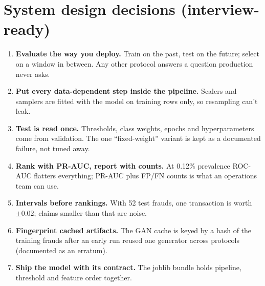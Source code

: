 \documentclass[11pt,a4paper]{article}
\begin{document}
\section{System design decisions (interview-ready)}
\begin{enumerate}[leftmargin=1.2cm]
\item \textbf{Evaluate the way you deploy.} Train on the past, test on the future; select on a window in
between. Any other protocol answers a question production never asks.
\item \textbf{Put every data-dependent step inside the pipeline.} Scalers and samplers are fitted with the
model on training rows only, so resampling can't leak.
\item \textbf{Test is read once.} Thresholds, class weights, epochs and hyperparameters come from
validation. The one ``fixed-weight'' variant is kept as a documented failure, not tuned away.
\item \textbf{Rank with PR-AUC, report with counts.} At 0.12\% prevalence ROC-AUC flatters everything;
PR-AUC plus FP/FN counts is what an operations team can use.
\item \textbf{Intervals before rankings.} With 52 test frauds, one transaction is worth $\pm0.02$; claims
smaller than that are noise.
\item \textbf{Fingerprint cached artifacts.} The GAN cache is keyed by a hash of the training frauds after
an early run reused one generator across protocols (documented as an erratum).
\item \textbf{Ship the model with its contract.} The joblib bundle holds pipeline, threshold and feature
order together.
\end{enumerate}
\end{document}
